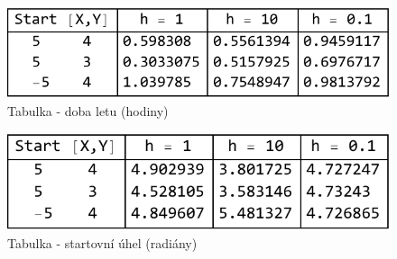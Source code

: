 \documentclass[reqno, a4paper]{amsart}
\numberwithin{equation}{section}
\begin{document}
\begin{figure}
\includegraphics[scale=0.7]{figures/Kvad - tab. čas.pdf}
\caption{Tabulka - doba letu (hodiny)}
\label{TabK1}
\end{figure}
\begin{figure}
\includegraphics[scale=0.7]{figures/Kvad - tab. beta.pdf}
\caption{Tabulka - startovní úhel (radiány)}
\label{TabK2}
\end{figure}



























\end{document}
